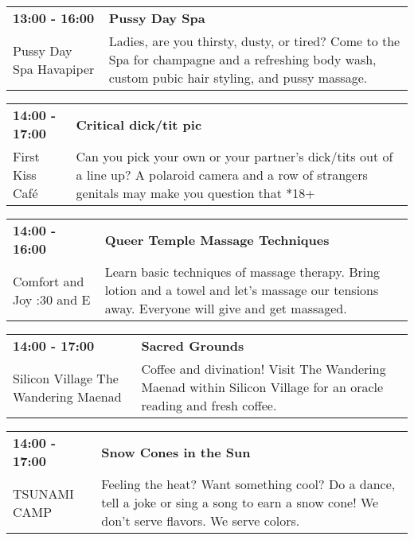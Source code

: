 \begin{tabular}{ p{1in} p{2.2in} }
    \textbf{13:00 - 16:00} & \textbf{Pussy Day Spa} \\
    Pussy Day Spa \newline Havapiper & Ladies, are you thirsty, dusty, or tired? Come to the Spa for champagne and a refreshing body wash, custom pubic hair styling, and pussy massage. \\
    \hline 
\end{tabular}
    
\begin{tabular}{ p{1in} p{2.2in} }
    \textbf{14:00 - 17:00} & \textbf{Critical dick/tit pic} \\
    First Kiss Caf\'e \newline  & Can you pick your own or your partner's dick/tits out of a line up?  A polaroid camera and a row of strangers genitals may make you question that *18+ \\
    \hline 
\end{tabular}
    
\begin{tabular}{ p{1in} p{2.2in} }
    \textbf{14:00 - 16:00} & \textbf{Queer Temple Massage Techniques} \\
    Comfort and Joy \newline 7:30 and E & Learn basic techniques of massage therapy.  Bring lotion and a towel and let's massage our tensions away. Everyone will give and get massaged. \\
    \hline 
\end{tabular}
    
\begin{tabular}{ p{1in} p{2.2in} }
    \textbf{14:00 - 17:00} & \textbf{Sacred Grounds} \\
    Silicon Village \newline The Wandering Maenad & Coffee and divination!  Visit The Wandering Maenad within Silicon Village for an oracle reading and fresh coffee. \\
    \hline 
\end{tabular}
    
\begin{tabular}{ p{1in} p{2.2in} }
    \textbf{14:00 - 17:00} & \textbf{Snow Cones in the Sun} \\
    TSUNAMI CAMP \newline  & Feeling the heat?  Want something cool?
Do a dance, tell a joke or sing a song to earn a snow cone!  We don't serve flavors. We serve colors. \\
    \hline 
\end{tabular}
    
